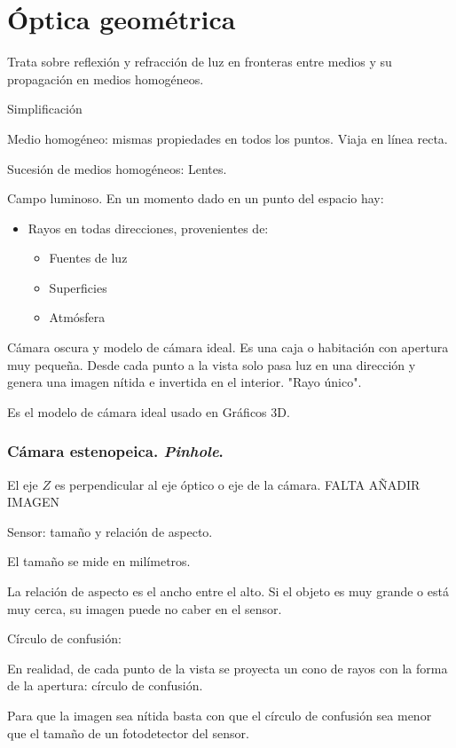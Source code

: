 \documentclass[a4paper]{book}
\begin{document}
\section{Óptica geométrica}

Trata sobre reflexión y refracción de luz en fronteras entre medios y su propagación en medios homogéneos.

Simplificación

Medio homogéneo: mismas propiedades en todos los puntos. Viaja en línea recta.

Sucesión de medios homogéneos: Lentes.

Campo luminoso. En un momento dado en un punto del espacio hay:
\begin{itemize}
	 \item Rayos en todas direcciones, provenientes de:
	 \begin{itemize}
		  \item Fuentes de luz
		  \item Superficies
		  \item Atmósfera
	 \end{itemize}
\end{itemize}

Cámara oscura y modelo de cámara ideal. Es una caja o habitación con apertura muy pequeña. Desde cada punto a la vista solo pasa luz en una dirección y genera una imagen nítida e invertida en el interior. "Rayo único".

Es el modelo de cámara ideal usado en Gráficos 3D.



\subsubsection{Cámara estenopeica. \textit{Pinhole}.}

El eje $Z$ es perpendicular al eje óptico o eje de la cámara. FALTA AÑADIR IMAGEN

Sensor: tamaño y relación de aspecto.

El tamaño se mide en milímetros.

La relación de aspecto es el ancho entre el alto. Si el objeto es muy grande o está muy cerca, su imagen puede no caber en el sensor.

Círculo de confusión:

En realidad, de cada punto de la vista se proyecta un cono de rayos con la forma de la apertura: círculo de confusión.

Para que la imagen sea nítida basta con que el círculo de confusión sea menor que el tamaño de un fotodetector del sensor.
\end{document}
